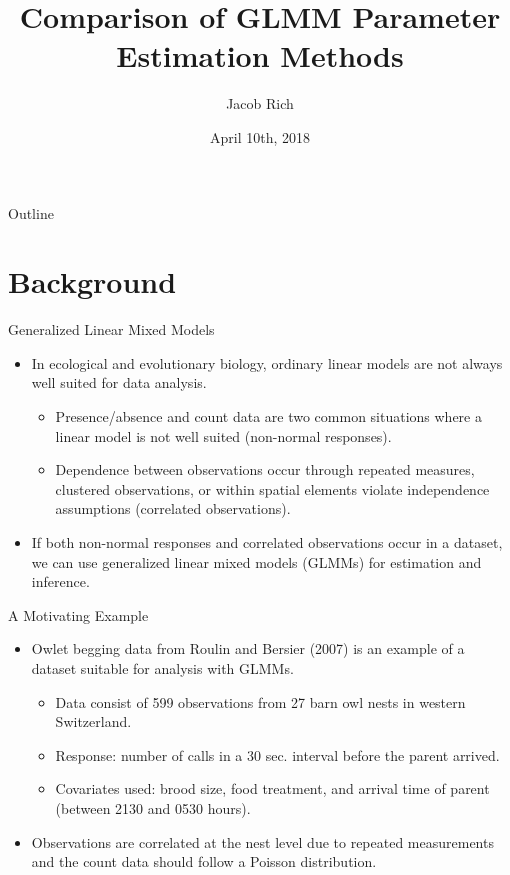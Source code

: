 \documentclass{beamer}\usepackage[]{graphicx}\usepackage[]{color}
\title{Comparison of GLMM Parameter Estimation Methods}
\author{Jacob Rich}
\date{April 10th, 2018}
\begin{document}
\begin{frame}
  \titlepage
\end{frame}

\begin{frame}{Outline}
  \tableofcontents
\end{frame}



\section{Background}

\begin{frame}{Generalized Linear Mixed Models}
  \begin{itemize}
        \item In ecological and evolutionary biology, ordinary linear models are not always well suited for data analysis.
        \begin{itemize}
          \item Presence/absence and count data are two common situations where a linear model is not well suited (non-normal responses).
          \item Dependence between observations occur through repeated measures, clustered observations, or within spatial elements violate independence assumptions (correlated observations). \pause
        \end{itemize}
        \item If both non-normal responses and correlated observations occur in a dataset, we can use generalized linear mixed models (GLMMs) for estimation and inference.
  \end{itemize}
\end{frame}

\begin{frame}{A Motivating Example}
  \begin{itemize}
        \item Owlet begging data from Roulin and Bersier (2007) is an example of a dataset suitable for analysis with GLMMs.
        \begin{itemize}
          \item Data consist of 599 observations from 27 barn owl nests in western Switzerland.
          \item Response: number of calls in a 30 sec. interval before the parent arrived. 
          \item Covariates used: brood size, food treatment, and arrival time of parent (between 2130 and 0530 hours).
        \end{itemize}
        \item Observations are correlated at the nest level due to repeated measurements and the count data should follow a Poisson distribution. 
  \end{itemize}
\end{frame}
\end{document}
